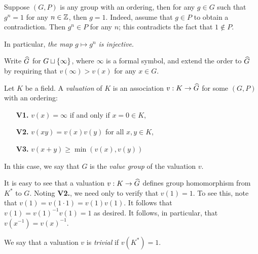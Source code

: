 \begin{rmk}
Suppose $(G, P)$ is any group with an ordering, then for any $g 
\in G$ such that $g^n = 1$ for any $n \in \mathbb{Z}$, then $g = 1$. 
Indeed, assume \WLOG that $g \in P$ to obtain a contradiction. 
Then $g^n \in P$ for any $n$; this contradicts the fact that $1 
\notin P$.

In particular, \emph{the map $g \mapsto g^n$ is injective}.
\end{rmk}

\begin{defn}
Write $\widehat{G}$ for $G \sqcup \{\infty\}$, where $\infty$ is a 
formal symbol, and extend the order to $\widehat{G}$ by requiring that 
$v(\infty) > v(x)$ for any $x \in G$.

Let $K$ be a field. A \emph{valuation} of $K$ is an association 
$v: K \to \widehat{G}$ for some $(G, P)$ with an ordering:

\begin{enumerate}
\item[\textbf{V1.}] $v(x) = \infty$ if and only if $x = 0 \in K$,

\item[\textbf{V2.}] $v(xy) = v(x)v(y)$ for all $x, y \in K$,

\item[\textbf{V3.}] $v(x + y) \geq \min(v(x), v(y))$
\end{enumerate}

In this case, we say that $G$ is the \emph{value group} of the 
valuation $v$.
\end{defn}

\begin{rmk}\label{rmk_grp_morph}
It is easy to see that a valuation $v: K \to \widehat{G}$
defines group homomorphism from $K^*$ to $G$. Noting \textbf{V2.},
we need only to verify that $v(1) = 1$. To see this, note that 
$v(1) = v(1 \cdot 1) = v(1)v(1)$. It follows that $v(1) = 
v(1)^{-1}v(1) = 1$ as desired. It follows, in particular, that
$v(x^{-1}) = v(x)^{-1}$.
\end{rmk}

We say that a valuation $v$ is \emph{trivial} if $v(K^*) = 1$.

